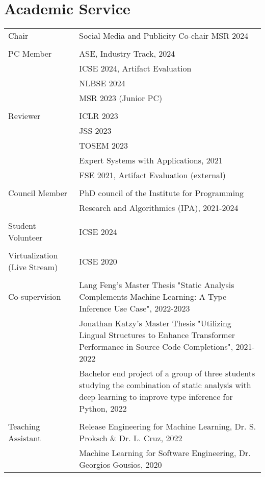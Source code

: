 \section*{Academic Service}
\begin{longtable}{p{} p{}}
    Chair & Social Media and Publicity Co-chair MSR 2024 \\
    & \\
    PC Member &  ASE, Industry Track, 2024 \\
    & ICSE 2024, Artifact Evaluation \\
    & NLBSE 2024 \\
    & MSR 2023 (Junior PC) \\
    & \\

    Reviewer & ICLR 2023 \\
             & JSS 2023 \\
             & TOSEM 2023 \\
             & Expert Systems with Applications, 2021\\
             & FSE 2021, Artifact Evaluation (external) \\
             & \\
    
    Council Member & PhD council of the Institute for Programming \\
                  &  Research and Algorithmics (IPA), 2021-2024 \\
                  & \\

    Student Volunteer & ICSE 2024 \\
    & \\

    Virtualization (Live Stream) & ICSE 2020 \\
    & \\
    Co-supervision & Lang Feng's Master Thesis "Static Analysis Complements Machine Learning: A Type Inference Use Case", 2022-2023 \\
    & Jonathan Katzy's Master Thesis "Utilizing Lingual Structures to Enhance Transformer Performance in Source Code Completions", 2021-2022 \\
    & Bachelor end project of a group of three students studying the combination of static analysis with deep learning to improve type inference for Python, 2022 \\
    & \\
    Teaching Assistant & Release Engineering for Machine Learning, Dr. S. Proksch \& Dr. L. Cruz, 2022 \\
    & Machine Learning for Software Engineering, Dr. Georgios Gousios, 2020 \\ 
\end{longtable}

